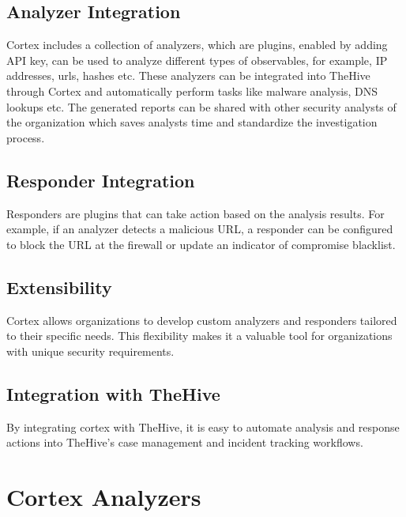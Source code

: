 \documentclass{book}
\begin{document}
\subsection{Analyzer Integration}
Cortex includes a collection of analyzers, which
are plugins, enabled by adding API key, can be used to analyze different types of observables, for example, IP addresses, urls, hashes etc.
These analyzers can be integrated into TheHive through Cortex and
automatically perform tasks like malware analysis, DNS lookups etc.
The generated reports can be shared with other security analysts of
the organization which saves analysts time and standardize the investigation process.

\subsection{Responder Integration}
Responders are plugins that can take action
based on the analysis results. For example, if an analyzer detects a
malicious URL, a responder can be configured to block the URL at the
firewall or update an indicator of compromise blacklist.

\subsection{Extensibility}
Cortex allows organizations to develop custom analyzers
and responders tailored to their specific needs. This flexibility makes it
a valuable tool for organizations with unique security requirements.

\subsection{Integration with TheHive}
By integrating cortex with TheHive, it
is easy to automate analysis and response actions into TheHive’s case
management and incident tracking workflows.

\newpage

\section{Cortex Analyzers}
\end{document}
